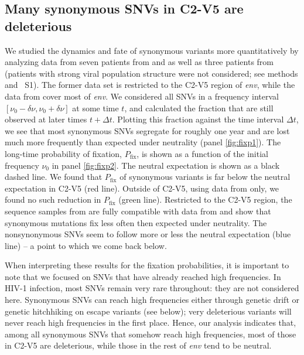 \documentclass[11pt]{article}
\newcommand{\pfix}{P_{\mathrm{fix}}}
\newcommand{\env}{\textit{env}}
\newcommand{\shankaregion}{C2-V5}
\newcommand{\PCApat}{1}
\begin{document}
\subsection*{Many synonymous SNVs in \shankaregion{} are deleterious}
We studied the dynamics and fate of synonymous variants more quantitatively by
analyzing data from seven patients from \citet{shankarappa_consistent_1999} and
\citet{liu_selection_2006} as well as three patients from
\citet{bunnik_autologous_2008} (patients with strong viral population structure
were not considered; see methods and \figurename~S\PCApat). The
former data set is restricted to the \shankaregion{} region of \env, while the
data from \citet{bunnik_autologous_2008} cover most of \env.  We considered all
SNVs in a frequency interval $[\nu_0-\delta\nu, \nu_0+\delta\nu]$ at some time
$t$, and calculated the fraction that are still observed at later times $t+\Delta
t$. Plotting this fraction against the time interval $\Delta t$, we see that
most synonymous SNVs segregate for roughly one year and are lost much more
frequently than expected under neutrality (panel \ref{fig:fixp1}). The long-time
probability of fixation, $\pfix$, is shown as a function of the initial
frequency $\nu_0$ in panel \ref{fig:fixp2}. The neutral expectation is
shown as a black dashed line. We found that $\pfix$ of synonymous
variants is far below the neutral expectation in \shankaregion{} (red line).
Outside of \shankaregion, using data from \citet{bunnik_autologous_2008} only,
we found no such reduction in $\pfix$ (green line). Restricted to the
\shankaregion{} region, the sequence samples from \citet{bunnik_autologous_2008}
are fully compatible with data from \citet{shankarappa_consistent_1999}
and show that synonymous mutations fix less often then expected under neutrality. The
nonsynonymous SNVs seem to follow more or less the neutral expectation (blue
line) -- a point to which we come back below.

When interpreting these results for the fixation probabilities, it is important
to note that we focused on SNVs that have already reached high frequencies. In
HIV-1 infection, most SNVs remain very rare throughout: they are not considered
here. Synonymous SNVs can reach high frequencies either through genetic
drift or genetic hitchhiking on escape variants (see below); very deleterious
variants will never reach high frequencies in the first place. Hence, our
analysis indicates that, among all synonymous SNVs that somehow reach high
frequencies, most of those in \shankaregion{} are deleterious, while
those in the rest of \env{} tend to be neutral.
\end{document}
